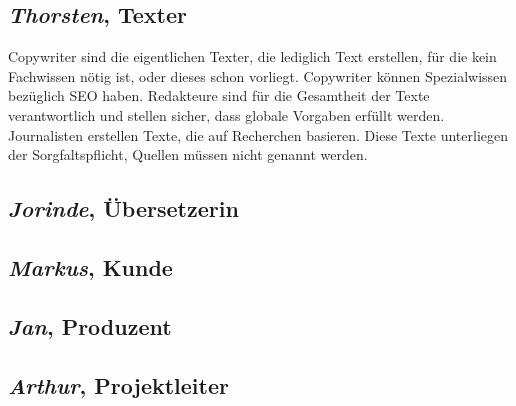 \subsection{\emph{Thorsten}, Texter}\label{p:thorsten}

Copywriter sind die eigentlichen Texter, die lediglich Text erstellen, für die kein Fachwissen nötig ist, oder dieses schon vorliegt. Copywriter können Spezialwissen bezüglich SEO haben. Redakteure sind für die Gesamtheit der Texte verantwortlich und stellen sicher, dass globale Vorgaben erfüllt werden. Journalisten erstellen Texte, die auf Recherchen basieren. Diese Texte unterliegen der Sorgfaltspflicht, Quellen müssen nicht genannt werden. 

\subsection{\emph{Jorinde}, Übersetzerin}\label{p:jorinde}

\subsection{\emph{Markus}, Kunde}\label{p:markus}

\subsection{\emph{Jan}, Produzent}\label{p:jan}

\subsection{\emph{Arthur}, Projektleiter}\label{p:arthur}